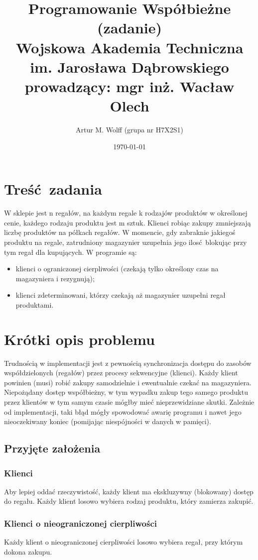 \documentclass[titlepage]{article}
\title{
	\Large{Programowanie Współbieżne (zadanie)}
	\\
	\normalsize{Wojskowa Akademia Techniczna im. Jarosława Dąbrowskiego}
	\\
	\normalsize{prowadzący: mgr inż. Wacław Olech}
	}
\author{Artur M. Wolff (grupa nr H7X2S1)}
\date{\today}
\begin{document}
\maketitle

\section{Treść zadania}
W sklepie jest n regałów, na każdym regale k rodzajów produktów w określonej cenie, każdego rodzaju produktu jest m sztuk.
Klienci robiąc zakupy zmniejszają liczbę produktów na półkach regałów.
W momencie, gdy zabraknie jakiegoś produktu na regale, zatrudniony magazynier uzupełnia jego ilosć blokując przy tym regał dla kupujących.
W programie są:
\begin{itemize}
	\item klienci o ograniczonej cierpliwości (czekają tylko określony czas na magazyniera i rezygnują);
	\item klienci zdeterminowani, którzy czekają aż magazynier uzupełni regał produktami.
\end{itemize}

\section{Krótki opis problemu}
Trudnością w implementacji jest z pewnością synchronizacja dostępu do zasobów współdzielonych (regałów) przez procesy sekwencyjne (klienci).
Każdy klient powinien (musi) robić zakupy samodzielnie i ewentualnie czekać na magazyniera.
Niepożądany dostęp współbieżny, w tym wypadku zakup tego samego produktu przez klientów w tym samym czasie mógłby mieć nieprzewidziane skutki.
Zależnie od implementacji, taki błąd mógły spowodować awarię programu i nawet jego nieoczekiwany koniec (pomijając niespójności w danych w pamięci).

\subsection{Przyjęte założenia}

\subsubsection{Klienci}
Aby lepiej oddać rzeczywistość, każdy klient ma ekskluzywny (blokowany) dostęp do regału.
Każdy klient losowo wybiera rodzaj produktu, który zamierza zakupić.

\subsubsection{Klienci o nieograniczonej cierpliwości}
Każdy klient o nieograniczonej cierpliwości losowo wybiera regał, przy którym dokona zakupu.
\end{document}
